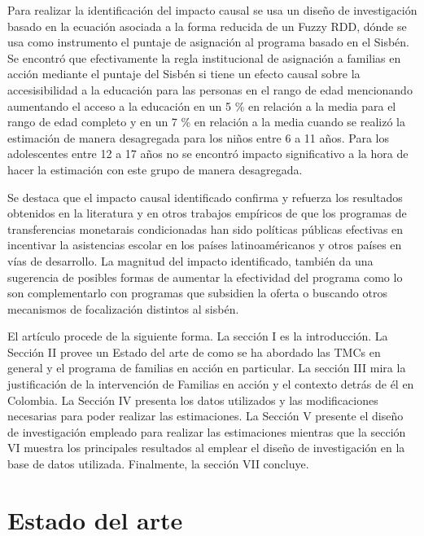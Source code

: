 \documentclass[AER]{AEA}
\begin{document}
Para realizar la identificación del impacto causal se usa un diseño de investigación basado en la ecuación asociada a la forma reducida de un Fuzzy RDD, dónde se usa como instrumento el puntaje de asignación al programa basado en el Sisbén. Se encontró que efectivamente la regla institucional de asignación a familias en acción mediante el puntaje del Sisbén si tiene un efecto causal sobre la accesisibilidad a la educación para las personas en el rango de edad mencionando aumentando el acceso a la educación en un 5 \% en relación a la media para el rango de edad completo y en un 7 \% en relación a la media cuando se realizó la estimación de manera desagregada para los niños entre 6 a 11 años. Para los adolescentes entre 12 a 17 años no se encontró impacto significativo a la hora de hacer la estimación con este grupo de manera desagregada. 

Se destaca que el impacto causal identificado confirma y refuerza los resultados obtenidos en la literatura y en otros trabajos empíricos de que los programas de transferencias monetarais condicionadas han sido políticas públicas efectivas en incentivar la asistencias escolar en los países latinoaméricanos y otros países en vías de desarrollo. La magnitud del impacto identificado, también da una sugerencia de posibles formas de aumentar la efectividad del programa como lo son complementarlo con programas que subsidien la oferta o buscando otros mecanismos de focalización distintos al sisbén. 

El artículo procede de la siguiente forma. La sección I es la introducción. La Sección II provee un Estado del arte de como se ha abordado las TMCs en general y el programa de familias en acción en particular. La sección III mira la justificación de la intervención de Familias en acción y el contexto detrás de él en Colombia. La Sección IV presenta los datos utilizados y las modificaciones necesarias para poder realizar las estimaciones. La Sección V presente el diseño de investigación empleado para realizar las estimaciones mientras que la sección VI muestra los principales resultados al emplear el diseño de investigación en la base de datos utilizada. Finalmente, la sección VII concluye. 

\section{Estado del arte}
\end{document}
